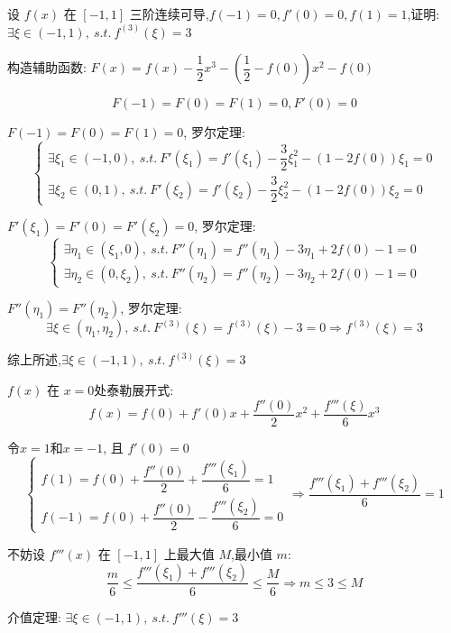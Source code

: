 \begin{proposition}
	设 $f(x)$ 在 $[-1,1]$ 三阶连续可导,$f(-1)=0,f'(0)=0,f(1)=1$,证明: $\exists \xi\in(-1,1),\ s.t.\ f^{(3)}(\xi)=3$
\end{proposition}
\begin{solution}

	构造辅助函数: $F(x)=f(x)-\dfrac{1}{2}x^3-\left( \dfrac{1}{2}-f(0)\right) x^2-f(0)$

	$$F(-1)=F(0)=F(1)=0,F'(0)=0$$

	$F(-1) = F(0) =F(1) = 0$, 罗尔定理:
	$$\begin{cases}
		\exists \xi_{1}\in(-1,0),\ s.t.\ F'(\xi_{1})=f'(\xi_{1})-\dfrac{3}{2}\xi_{1}^2-\left( 1-2f(0)\right)\xi_{1}=0 \\
		\exists \xi_{2}\in(0,1),\ s.t.\ F'(\xi_{2})=f'(\xi_{2})-\dfrac{3}{2}\xi_{2}^2-\left( 1-2f(0)\right)\xi_{2}=0
	\end{cases}$$

	$F'(\xi_{1}) = F'(0) = F'(\xi_{2}) = 0$, 罗尔定理:
	$$\begin{cases}
		\exists \eta_{1}\in(\xi_{1},0),\ s.t.\ F''(\eta_{1})=f''(\eta_{1})-3\eta_{1}+2f(0)-1=0 \\
		\exists \eta_{2}\in(0,\xi_{2}),\ s.t.\ F''(\eta_{2})=f''(\eta_{2})-3\eta_{2}+2f(0)-1=0
	\end{cases}$$

	$F''(\eta_{1}) = F''(\eta_{2})$, 罗尔定理:
	$$\exists \xi\in(\eta_{1},\eta_{2}),\ s.t.\ F^{(3)}(\xi)=f^{(3)}(\xi)-3=0\Rightarrow f^{(3)}(\xi)=3$$

	综上所述,$\exists \xi\in(-1,1),\ s.t.\ f^{(3)}(\xi)=3$
\end{solution}
\begin{anymark}[泰勒展开]
	$f(x)$ 在 $x=0$处泰勒展开式:
	$$f(x) = f(0)+f'(0)x+\dfrac{f''(0)}{2}x^2+\dfrac{f'''(\xi)}{6}x^3$$

	令$x=1$和$x=-1$, 且 $f'(0)=0$
	$$\begin{cases}
		f(1) = f(0)+\dfrac{f''(0)}{2}+\dfrac{f'''(\xi_{1})}{6}=1 \\
		f(-1) = f(0)+\dfrac{f''(0)}{2}-\dfrac{f'''(\xi_{2})}{6}=0
	\end{cases}\Rightarrow
	\dfrac{f'''(\xi_{1})+f'''(\xi_{2})}{6}=1$$

	不妨设 $f'''(x)$ 在 $[-1,1]$ 上最大值 $M$,最小值 $m$:
	$$\dfrac{m}{6}\leq\dfrac{f'''(\xi_{1})+f'''(\xi_{2})}{6}\leq \dfrac{M}{6}\Rightarrow m\leq 3\leq M$$

	介值定理: $\exists \xi\in(-1,1),\ s.t.\ f'''(\xi)=3$
\end{anymark}

